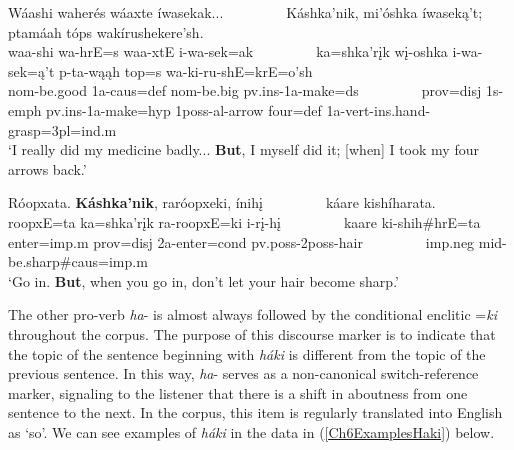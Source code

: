\begin{exe}
\begin{xlist}
        \item\label{Ch6ExKashkaC} \glll Wáashi waherés wáaxte íwasekak... ~ ~ ~ ~ ~ Káshka'nik, mi'óshka íwaseką't; ptamáah tóps wakírushekere'sh.\\
        waa-shi wa-hrE=s waa-xtE i-wa-sek=ak ~ ~ ~ ~ ~ ka=shka'rįk wį-oshka i-wa-sek=ą't p-ta-wąąh top=s wa-ki-ru-shE=krE=o'sh\\
        nom-\textnormal{be.good} 1a-caus=def nom-\textnormal{be.big} pv.ins-1a-\textnormal{make}=ds ~ ~ ~ ~ ~ prov=disj 1s-emph pv.ins-1a-\textnormal{make}=hyp 1poss-al-\textnormal{arrow} \textnormal{four}=def 1a-vert-ins.hand-\textnormal{grasp}=3pl=ind.m\\
        \glt `I really did my medicine badly... \textbf{But}, I myself did it; [when] I took my four arrows back.' \citep[35]{hollow1973a}

        \item\label{Ch6ExKashkaD} \glll Róopxata. \textbf{Káshka'nik}, raróopxeki, ínihį ~ ~ ~ ~ ~ káare kishíharata.\\
        roopxE=ta ka=shka'rįk ra-roopxE=ki i-rį-hį ~ ~ ~ ~ ~ kaare ki-shih\#hrE=ta\\
        \textnormal{enter}=imp.m prov=disj 2a-\textnormal{enter}=cond pv.poss-2poss-\textnormal{hair} ~ ~ ~ ~ ~ imp.neg mid-\textnormal{be.sharp}\#caus=imp.m\\
        \glt `Go in. \textbf{But}, when you go in, don't let your hair become sharp.' \citep[4]{hollow1973b}
    \end{xlist}
\end{exe}

The other pro-verb \textit{ha}- is almost always followed by the conditional enclitic =\textit{ki} throughout the corpus. The purpose of this discourse marker is to indicate that the topic of the sentence beginning with \textit{háki} is different from the topic of the previous sentence. In this way, \textit{ha}- serves as a non-canonical switch-reference marker, signaling to the listener that there is a shift in aboutness from one sentence to the next. In the corpus, this item is regularly translated into English as `so'. We can see examples of \textit{háki} in the data in (\ref{Ch6ExamplesHaki}) below.

